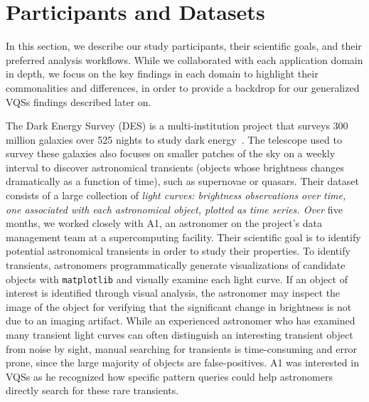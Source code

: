  \section{Participants and Datasets\label{sec:participantdatasets}}
 In this section, we describe our study participants, their scientific goals, and their preferred analysis workflows. %
 While we collaborated with each application domain in depth, we focus on the key findings in each domain to highlight their commonalities and differences, in order to provide a backdrop for our generalized VQSs findings described later on.
 \par\noindent{} The Dark Energy Survey (DES) is a multi-institution project that surveys 300 million galaxies over 525 nights to study dark energy~\cite{Drlica-Wagner2017}. The telescope used to survey these galaxies also focuses on smaller patches of the sky on a weekly interval to discover astronomical transients (objects whose brightness changes dramatically as a function of time), such as supernovae or quasars. Their dataset consists of a large collection of \emph{light curves: brightness observations over time, one associated with each astronomical object, plotted as time series. Over} five months, we worked closely with A1, an astronomer on the project's data management team at a supercomputing facility. Their scientific goal is to identify potential astronomical transients in order to study their properties. 
 \npar To identify transients, astronomers programmatically generate visualizations of candidate objects with \texttt{matplotlib} and visually examine each light curve. If an object of interest is identified through visual analysis, the astronomer may inspect the image of the object for verifying that the significant change in brightness is not due to an imaging artifact. While an experienced astronomer who has examined many transient light curves can often distinguish an interesting transient object from noise by sight, manual searching for transients is time-consuming and error prone, since the large majority of objects are false-positives. A1 was interested in VQSs as he recognized how specific pattern queries could help astronomers directly search for these rare transients.
